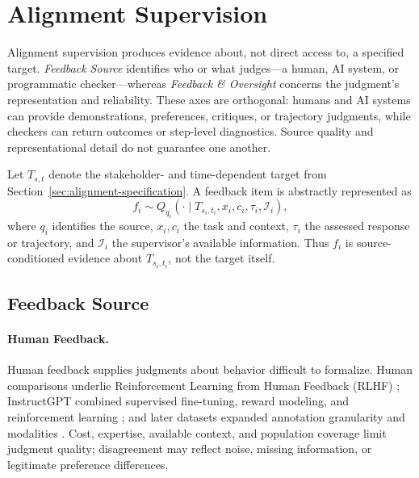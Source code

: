 \documentclass[11pt]{article}
\begin{document}
\section{Alignment Supervision}
\label{sec:alignment-supervision}

Alignment supervision produces evidence about, not direct access to, a specified target. \emph{Feedback Source} identifies who or what judges---a human, AI system, or programmatic checker---whereas \emph{Feedback \& Oversight} concerns the judgment's representation and reliability. These axes are orthogonal: humans and AI systems can provide demonstrations, preferences, critiques, or trajectory judgments, while checkers can return outcomes or step-level diagnostics. Source quality and representational detail do not guarantee one another.

Let \(T_{s,t}\) denote the stakeholder- and time-dependent target from Section~\ref{sec:alignment-specification}. A feedback item is abstractly represented as
\begin{equation}
f_i \sim Q_{q_i}\!\left(
\cdot \mid T_{s_i,t_i},x_i,c_i,\tau_i,\mathcal{I}_i
\right),
\label{eq:alignment-supervision}
\end{equation}
where \(q_i\) identifies the source, \(x_i,c_i\) the task and context, \(\tau_i\) the assessed response or trajectory, and \(\mathcal{I}_i\) the supervisor's available information. Thus \(f_i\) is source-conditioned evidence about \(T_{s_i,t_i}\), not the target itself.

\subsection{Feedback Source}
\label{subsec:feedback-source}

\paragraph{Human Feedback.}
Human feedback supplies judgments about behavior difficult to formalize. Human comparisons underlie Reinforcement Learning from Human Feedback (RLHF) \citep{christiano2017preferences,stiennon2020summarization}; InstructGPT combined supervised fine-tuning, reward modeling, and reinforcement learning \citep{ouyang2022instructgpt}; and later datasets expanded annotation granularity and modalities \citep{wang2024helpsteer2,xu2024finegrained,yu2024rlhfv}. Cost, expertise, available context, and population coverage limit judgment quality; disagreement may reflect noise, missing information, or legitimate preference differences.
\end{document}
